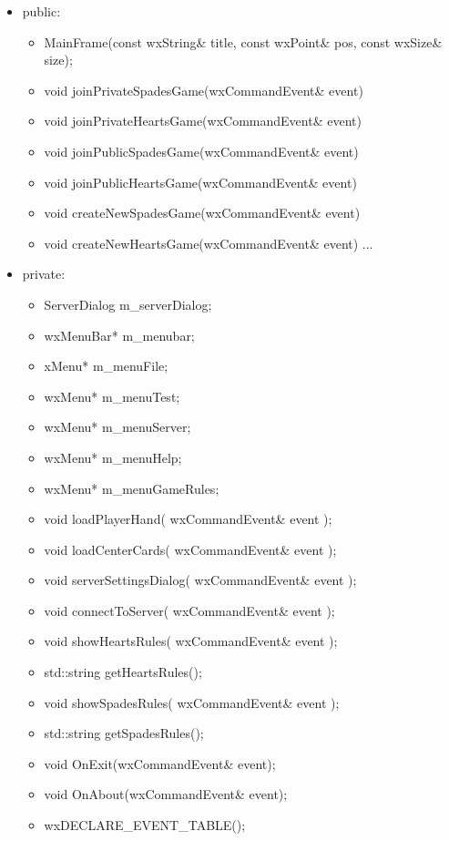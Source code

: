 \documentclass[]{scrartcl}
\begin{document}
	\begin{itemize}
		\item public:

		\begin{itemize}
			\item MainFrame(const wxString\& title, const wxPoint\& pos, const wxSize\& size);
			\item void joinPrivateSpadesGame(wxCommandEvent\& event) {}
			\item void joinPrivateHeartsGame(wxCommandEvent\& event) {}
			\item void joinPublicSpadesGame(wxCommandEvent\& event) {}
			\item void joinPublicHeartsGame(wxCommandEvent\& event) {}
			\item void createNewSpadesGame(wxCommandEvent\& event) {}
			\item void createNewHeartsGame(wxCommandEvent\& event) {}...
		\end{itemize}
	\end{itemize}
	\begin{itemize}
		\item 	private:
		
		\begin{itemize}
			\item ServerDialog m\_serverDialog;
			\item wxMenuBar* m\_menubar;
			\item xMenu* m\_menuFile;
			\item wxMenu* m\_menuTest;
			\item wxMenu* m\_menuServer;
			\item wxMenu* m\_menuHelp;
			\item wxMenu* m\_menuGameRules;
			\item void loadPlayerHand( wxCommandEvent\& event );
			\item void loadCenterCards( wxCommandEvent\& event );
			\item void serverSettingsDialog( wxCommandEvent\& event );
			\item void connectToServer( wxCommandEvent\& event );
			\item void showHeartsRules( wxCommandEvent\& event );
			\item std::string getHeartsRules();
			\item void showSpadesRules( wxCommandEvent\& event );
			\item std::string getSpadesRules();
			\item void OnExit(wxCommandEvent\& event);
			\item void OnAbout(wxCommandEvent\& event);
			\item wxDECLARE\_EVENT\_TABLE();
		\end{itemize}
	\end{itemize}
\end{document}
